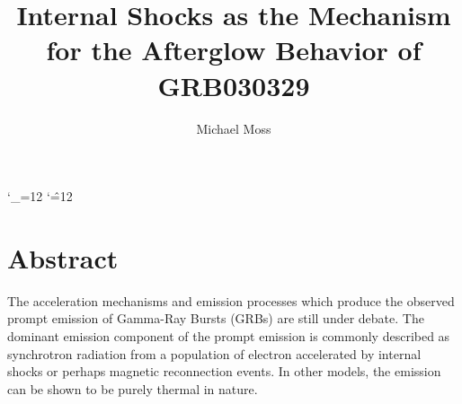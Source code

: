 \documentclass[linenumbers]{aastex631}
\def\upsubscripts{\catcode`\_=12 } \def\normalsubscripts{\catcode`\_=8 }
\def\upsupscripts{\catcode`\^=12 } \def\normalsupscripts{\catcode`\^=7 }
\begin{document}
\upsubscripts
\upsupscripts

\title{Internal Shocks as the Mechanism for the Afterglow Behavior of GRB030329}

\author{Michael Moss}




\section{Abstract}

The acceleration mechanisms and emission processes which produce the observed prompt emission of Gamma-Ray Bursts (GRBs) are still under debate. The dominant emission component of the prompt emission is commonly described as synchrotron radiation from a population of electron accelerated by internal shocks or perhaps magnetic reconnection events. In other models, the emission can be shown to be purely thermal in nature. 
\end{document}
